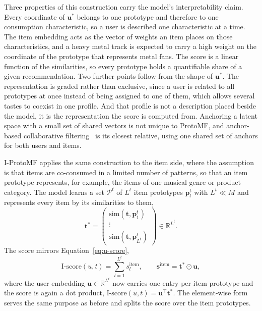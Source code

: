 Three properties of this construction carry the model's interpretability
claim. Every coordinate of $\mathbf{u}^*$ belongs to one prototype and
therefore to one consumption characteristic, so a user is described one
characteristic at a time. The item embedding acts as the vector of weights an
item places on those characteristics, and a heavy metal track is expected to
carry a high weight on the coordinate of the prototype that represents metal
fans. The score is a linear function of the similarities, so every prototype
holds a quantifiable share of a given recommendation. Two further points
follow from the shape of $\mathbf{u}^*$. The representation is graded rather
than exclusive, since a user is related to all prototypes at once instead of
being assigned to one of them, which allows several tastes to coexist in one
profile. And that profile is not a description placed beside the model, it is
the representation the score is computed from. Anchoring a latent space with a
small set of shared vectors is not unique to ProtoMF, and anchor-based
collaborative filtering~\cite{barkan2021acf} is its closest relative, using
one shared set of anchors for both users and items.

I-ProtoMF applies the same construction to the item side, where the assumption
is that items are co-consumed in a limited number of patterns, so that an item
prototype represents, for example, the items of one musical genre or product
category. The model learns a set $\mathcal{P}^t$ of $L^t$ item prototypes
$\mathbf{p}^t_l$ with $L^t \ll M$ and represents every item by its
similarities to them,
\begin{equation}
\mathbf{t}^* =
\begin{pmatrix}
\mathrm{sim}(\mathbf{t}, \mathbf{p}^t_1) \\
\vdots \\
\mathrm{sim}(\mathbf{t}, \mathbf{p}^t_{L^t})
\end{pmatrix}
\in \mathbb{R}^{L^t}.
\label{eq:proto-tstar}
\end{equation}
The score mirrors Equation~\ref{eq:u-score},
\begin{equation}
\text{I-score}(u,t) = \sum_{l=1}^{L^t} s^{\mathrm{item}}_l,
\qquad
\mathbf{s}^{\mathrm{item}} = \mathbf{t}^* \odot \mathbf{u},
\label{eq:i-score}
\end{equation}
where the user embedding $\mathbf{u} \in \mathbb{R}^{L^t}$ now carries one
entry per item prototype and the score is again a dot product,
$\text{I-score}(u,t) = \mathbf{u}^\top \mathbf{t}^*$. The element-wise form
serves the same purpose as before and splits the score over the item
prototypes.

